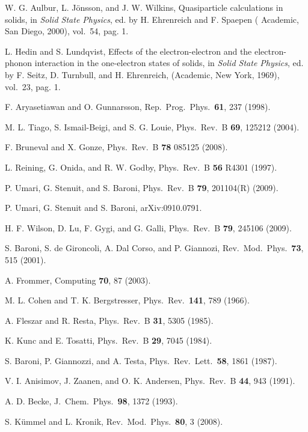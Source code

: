 \documentclass[twocolumn,prb,showpacs,superscriptaddress]{revtex4}
\begin{document}
\begin{thebibliography}{99}
W. G. Aulbur, L. J\"onsson, and J. W. Wilkins,
Quasiparticle calculations in solids,
in {\it Solid State Physics}, ed. by H. Ehrenreich and F. Spaepen (
Academic, San Diego, 2000), vol.\ 54, pag. 1.

L. Hedin and S. Lundqvist,
Effects of the electron-electron and the electron-phonon interaction in
the one-electron states of solids,
in {\it Solid State Physics}, ed. by F. Seitz, D. Turnbull, and
H. Ehrenreich, (Academic, New York, 1969), vol.\ 23, pag. 1.

F. Aryasetiawan and O. Gunnarsson,
Rep.\ Prog.\ Phys.\ {\bf 61}, 237 (1998). 

M. L. Tiago, S. Ismail-Beigi, and S. G. Louie,
Phys.\ Rev.\ B {\bf 69}, 125212 (2004).

F. Bruneval and X. Gonze,
Phys.\ Rev.\ B {\bf 78} 085125 (2008).

L. Reining, G. Onida, and R. W. Godby, 
Phys.\ Rev.\ B {\bf 56} R4301 (1997).

P. Umari, G. Stenuit, and S. Baroni,
Phys.\ Rev.\ B {\bf 79}, 201104(R) (2009).

P. Umari, G. Stenuit and S. Baroni,
arXiv:0910.0791.

H. F. Wilson, D. Lu, F. Gygi, and G. Galli,
Phys.\ Rev.\ B {\bf 79}, 245106 (2009).

S. Baroni, S. de Gironcoli, A. Dal Corso, and P. Giannozi, 
Rev.\ Mod.\ Phys.\ {\bf 73}, 515 (2001).

A. Frommer,
Computing {\bf 70}, 87 (2003).

M. L. Cohen and T. K. Bergstresser,
Phys.\ Rev.\ {\bf 141}, 789 (1966).

A. Fleszar and R. Resta,
Phys.\ Rev.\ B {\bf 31}, 5305 (1985).

K. Kunc and E. Tosatti,
Phys.\ Rev.\ B {\bf 29}, 7045 (1984).

S. Baroni, P. Giannozzi, and A. Testa,
Phys.\ Rev.\ Lett.\ {\bf 58}, 1861 (1987).

V. I. Anisimov, J. Zaanen, and O. K. Andersen,
Phys.\ Rev.\ B {\bf 44}, 943 (1991).

A. D. Becke,
J.\ Chem.\ Phys.\ {\bf 98}, 1372 (1993).

S. K\"ummel and L. Kronik,
Rev.\ Mod.\ Phys.\ {\bf 80}, 3 (2008).


\end{thebibliography}
\end{document}
